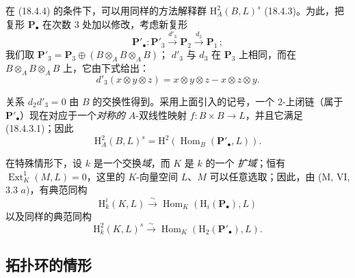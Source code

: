 \begin{env}[18.4.5]
\label{0.18.4.5-fr}
在 (18.4.4) 的条件下，可以用同样的方法解释群
$\mathrm H_A^2(B,L)^s$ (18.4.3)。为此，把复形 $\mathbf P_\bullet$ 在次数 $3$
处加以修改，考虑新复形
\[
  \mathbf P'_\bullet:\mathbf P'_3\xrightarrow{d'_3}\mathbf P_2
  \xrightarrow{d_2}\mathbf P_1\,;
\]
我们取 $\mathbf P'_3=\mathbf P_3\oplus(B\otimes_A B\otimes_A B)$；
$d'_3$ 与 $d_3$ 在 $\mathbf P_3$ 上相同，而在
$B\otimes_A B\otimes_A B$ 上，它由下式给出：
\[
  d'_3(x\otimes y\otimes z)=x\otimes y\otimes z-x\otimes z\otimes y.
\]

关系 $d_2d'_3=0$ 由 $B$ 的交换性得到。采用上面引入的记号，一个
$2$-上闭链（属于 $\mathbf P'_\bullet$）现在对应于一个\emph{对称的}
$A$-双线性映射 $f:B\times B\to L$，并且它满足 (18.4.3.1)；因此
\[
  \mathrm H_A^2(B,L)^s
  =\mathrm H^2(\operatorname{Hom}_B(\mathbf P'_\bullet,L)).
\]
\end{env}

\begin{env}[18.4.6]
\label{0.18.4.6-fr}
在特殊情形下，设 $k$ 是一个交换\emph{域}，而 $K$ 是 $k$ 的一个
\emph{扩域}；恒有 $\operatorname{Ext}_K^1(M,L)=0$，这里的 $K$-向量空间
$L$、$M$ 可以任意选取；因此，由 (M, VI, 3.3 $a$)，有典范同构
\begin{equation}
\label{0.18.4.6.1-fr}
\tag{18.4.6.1}
  \mathrm H_k^i(K,L)\xrightarrow{\sim}
  \operatorname{Hom}_K(\mathrm H_i(\mathbf P_\bullet),L)
\end{equation}
以及同样的典范同构
\begin{equation}
\label{0.18.4.6.2-fr}
\tag{18.4.6.2}
  \mathrm H_k^2(K,L)^s\xrightarrow{\sim}
  \operatorname{Hom}_K(\mathrm H_2(\mathbf P'_\bullet),L).
\end{equation}
\end{env}

\subsection{拓扑环的情形}
\label{subsection:0.18.5-fr}

